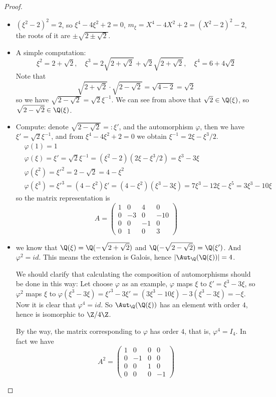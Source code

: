 \begin{proof}
\mbox{}
\begin{itemize}
\item $(\xi^2-2)^2=2$, so $\xi^4-4\xi^2+2=0$, $m_\xi=X^4-4X^2+2=(X^2-2)^2-2$, the roots of it are $\pm\sqrt{2\pm\sqrt{2}}$.
\item A simple computation:
\[\xi^2=2+\sqrt{2},\quad \xi^3=2\sqrt{2+\sqrt{2}}+\sqrt{2}\sqrt{2+\sqrt{2}},\quad \xi^4=6+4\sqrt{2}\]
Note that
\[\sqrt{2+\sqrt{2}}\cdot\sqrt{2-\sqrt{2}}=\sqrt{4-2}=\sqrt{2}\]
so we have $\sqrt{2-\sqrt{2}}=\sqrt{2}\xi^{-1}$. We can see from above that $\sqrt{2}\in\Q(\xi)$, so $\sqrt{2-\sqrt{2}}\in\Q(\xi)$.
\item Compute: denote $\sqrt{2-\sqrt{2}}=:\xi'$, and the automorphism $\varphi$, then we have $\xi'=\sqrt{2}\xi^{-1}$, and from $\xi^4-4\xi^2+2=0$ we obtain $\xi^{-1}=2\xi-\xi^3/2$.
\begin{align*}
&\varphi(1)=1\\
&\varphi(\xi)=\xi'=\sqrt{2}\xi^{-1}=(\xi^2-2)(2\xi-\xi^3/2)=\xi^3-3\xi\\
&\varphi(\xi^2)=\xi'^2=2-\sqrt{2}=4-\xi^2\\
&\varphi(\xi^3)=\xi'^3=(4-\xi^2)\xi'=(4-\xi^2)(\xi^3-3\xi)=7\xi^3-12\xi-\xi^5=3\xi^3-10\xi
\end{align*}
so the matrix representation is 
\[A=\begin{pmatrix}
1&0&4&0\\
0&-3&0&-10\\
0&0&-1&0\\
0&1&0&3 
\end{pmatrix}\]
\item we know that $\Q(\xi)=\Q(-\sqrt{2+\sqrt{2}})$ and $\Q(-\sqrt{2-\sqrt{2}})=\Q(\xi')$. And $\varphi^2=id$. This means the extension is Galois, hence $|\Aut_{\Q}(\Q(\xi))|=4$.\par
We should clarify that calculating the composition of automorphisms should be done in this way:
Let choose $\varphi$ as an example, $\varphi$ maps $\xi$ to $\xi'=\xi^3-3\xi$, so $\varphi^2$ maps $\xi$ to $\varphi(\xi^3-3\xi)=\xi'^3-3\xi'=(3\xi^3-10\xi)-3(\xi^3-3\xi)=-\xi$. Now it is clear that $\varphi^4=id$. So $\Aut_{\Q}(\Q(\xi))$ has an element with order $4$, hence is isomorphic to $\Z/4\Z$.\par
By the way, the matrix corresponding to $\varphi$ has order $4$, that is, $\varphi^4=I_4$. In fact we have
\[A^2=\begin{pmatrix}
1&0&0&0\\
0&-1&0&0\\
0&0&1&0\\
0&0&0&-1 
\end{pmatrix}\]
\end{itemize}
\end{proof}
